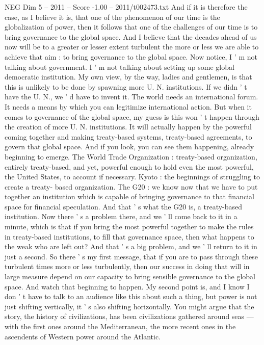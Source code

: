 \begin{textsample}{NEG Dim 5 – 2011 – Score -1.00 – 2011/t002473.txt}
And if it is therefore the case, as I believe it is, that one of the phenomenon of our time is the globalization of power, then it follows that one of the challenges of our time is to bring governance to the global space.
And I believe that the decades ahead of us now will be to a greater or lesser extent turbulent the more or less we are able to achieve that aim : to bring governance to the global space.
Now notice, I ' m not talking about government.
I ' m not talking about setting up some global democratic institution.
My own view, by the way, ladies and gentlemen, is that this is unlikely to be done by spawning more U.
N. institutions.
If we didn ' t have the U.
N., we ' d have to invent it.
The world needs an international forum.
It needs a means by which you can legitimize international action.
But when it comes to governance of the global space, my guess is this won ' t happen through the creation of more U.
N. institutions.
It will actually happen by the powerful coming together and making treaty-based systems, treaty-based agreements, to govern that global space.
And if you look, you can see them happening, already beginning to emerge.
The World Trade Organization : treaty-based organization, entirely treaty-based, and yet, powerful enough to hold even the most powerful, the United States, to account if necessary.
Kyoto : the beginnings of struggling to create a treaty- based organization.
The G20 : we know now that we have to put together an institution which is capable of bringing governance to that financial space for financial speculation.
And that ' s what the G20 is, a treaty-based institution.
Now there ' s a problem there, and we ' ll come back to it in a minute, which is that if you bring the most powerful together to make the rules in treaty-based institutions, to fill that governance space, then what happens to the weak who are left out?
And that ' s a big problem, and we ' ll return to it in just a second.
So there ' s my first message, that if you are to pass through these turbulent times more or less turbulently, then our success in doing that will in large measure depend on our capacity to bring sensible governance to the global space.
And watch that beginning to happen.
My second point is, and I know I don ' t have to talk to an audience like this about such a thing, but power is not just shifting vertically, it ' s also shifting horizontally.
You might argue that the story, the history of civilizations, has been civilizations gathered around seas — with the first ones around the Mediterranean, the more recent ones in the ascendents of Western power around the Atlantic.

\end{textsample}
